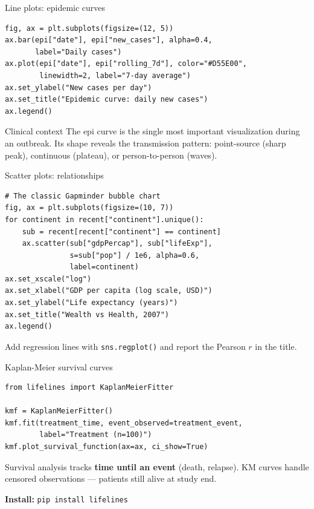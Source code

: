 \documentclass[aspectratio=169,11pt]{beamer}
\begin{document}
\begin{frame}[fragile]{Line plots: epidemic curves}
\begin{verbatim}
fig, ax = plt.subplots(figsize=(12, 5))
ax.bar(epi["date"], epi["new_cases"], alpha=0.4,
       label="Daily cases")
ax.plot(epi["date"], epi["rolling_7d"], color="#D55E00",
        linewidth=2, label="7-day average")
ax.set_ylabel("New cases per day")
ax.set_title("Epidemic curve: daily new cases")
ax.legend()
\end{verbatim}

\begin{exampleblock}{Clinical context}
The epi curve is the \alert{single most important visualization} during an outbreak. Its shape reveals the transmission pattern: point-source (sharp peak), continuous (plateau), or person-to-person (waves).
\end{exampleblock}
\end{frame}

\begin{frame}[fragile]{Scatter plots: relationships}
\begin{verbatim}
# The classic Gapminder bubble chart
fig, ax = plt.subplots(figsize=(10, 7))
for continent in recent["continent"].unique():
    sub = recent[recent["continent"] == continent]
    ax.scatter(sub["gdpPercap"], sub["lifeExp"],
               s=sub["pop"] / 1e6, alpha=0.6,
               label=continent)
ax.set_xscale("log")
ax.set_xlabel("GDP per capita (log scale, USD)")
ax.set_ylabel("Life expectancy (years)")
ax.set_title("Wealth vs Health, 2007")
ax.legend()
\end{verbatim}

Add regression lines with \texttt{sns.regplot()} and report the Pearson $r$ in the title.
\end{frame}

\begin{frame}[fragile]{Kaplan-Meier survival curves}
\begin{verbatim}
from lifelines import KaplanMeierFitter

kmf = KaplanMeierFitter()
kmf.fit(treatment_time, event_observed=treatment_event,
        label="Treatment (n=100)")
kmf.plot_survival_function(ax=ax, ci_show=True)
\end{verbatim}

\vspace{4pt}
Survival analysis tracks \textbf{time until an event} (death, relapse). KM curves handle \alert{censored} observations --- patients still alive at study end.

\vspace{4pt}
\textbf{Install:} \texttt{pip install lifelines}
\end{frame}
\end{document}
